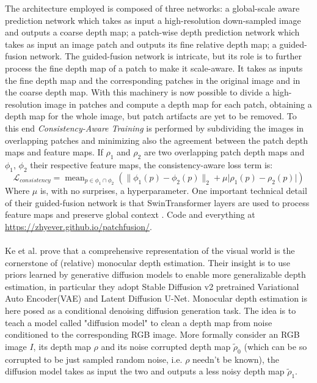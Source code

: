 The architecture employed is composed of three networks: a global-scale aware prediction network which takes as input a high-resolution down-sampled image and outputs a coarse depth map; a patch-wise depth prediction network which takes as input an image patch and outputs its fine relative depth map; a guided-fusion network.
The guided-fusion network is intricate, but its role is to further process the fine depth map of a patch to make it scale-aware.
It takes as inputs the fine depth map and the corresponding patches in the original image and in the coarse depth map.
With this machinery is now possible to divide a high-resolution image in patches and compute a depth map for each patch, obtaining a depth map for the whole image, but patch artifacts are yet to be removed.
To this end \textit{Consistency-Aware Training} is performed by subdividing the images in overlapping patches and minimizing also the agreement between the patch depth maps and feature maps.
If $\rho_{1}$ and $\rho_{2}$ are two overlapping patch depth maps and $\phi_{1}$, $\phi_{2}$ their respective feature maps, the consistency-aware loss term is:
\[
	\mathcal{L}_{consistency} = \mathop{\text{mean}}_{p \in \phi_{1} \cap \phi_{2}} \left( \big\| \phi_{1}(p) - \phi_{2}(p) \big\|_{2} + \mu \big| \rho_{1}(p) - \rho_{2}(p) \big| \right)
\]
Where $\mu$ is, with no surprises, a hyperparameter.
One important technical detail of their guided-fusion network is that SwinTransformer layers \cite{swin} are used to process feature maps and preserve global context \cite{PatchFusion}.
Code and everything at \url{https://zhyever.github.io/patchfusion/}.\\
\\
Ke et al. \cite{Marigold} prove that a comprehensive representation of the visual world is the cornerstone of (relative) monocular depth estimation.
Their insight is to use priors learned by generative diffusion models to enable more generalizable depth estimation, in particular they adopt Stable Diffusion v2 \cite{StableDiffusionV2} pretrained Variational Auto Encoder(VAE) and Latent Diffusion U-Net.
Monocular depth estimation is here posed as a conditional denoising diffusion generation task.
The idea is to teach a model called "diffusion model" to clean a depth map from noise conditioned to the corresponding RGB image.
More formally consider an RGB image $I$, its depth map $\rho$ and its noise corrupted depth map $\tilde{\rho}_{0}$ (which can be so corrupted to be just sampled random noise, i.e. $\rho$ needn't be known), the diffusion model takes as input the two and outputs a less noisy depth map $\tilde{\rho}_{1}$.
